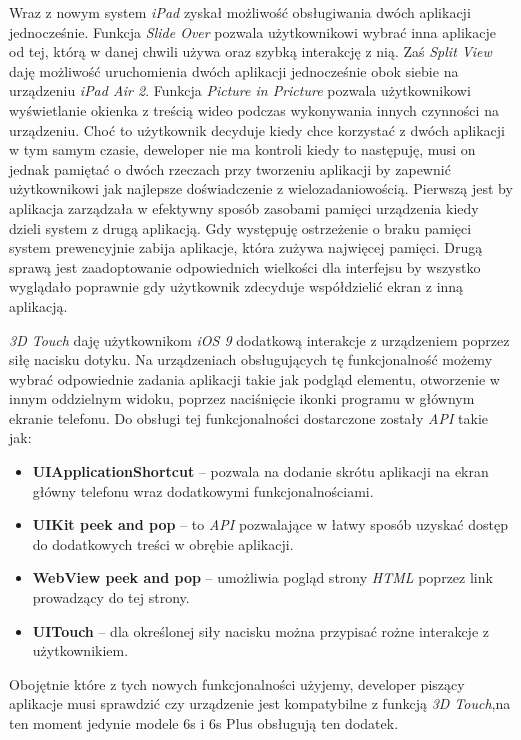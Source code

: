 \documentclass{iiuwb}
\begin{document}
Wraz z nowym system \textit{iPad} zyskał możliwość obsługiwania dwóch aplikacji jednocześnie. Funkcja \textit{Slide Over} pozwala użytkownikowi wybrać inna aplikacje od tej, którą w danej chwili używa oraz szybką interakcję z nią. Zaś \textit{Split View} daję możliwość uruchomienia dwóch aplikacji jednocześnie obok siebie na urządzeniu \textit{iPad Air 2}. Funkcja \textit{Picture in Pricture} pozwala użytkownikowi wyświetlanie okienka z treścią wideo podczas wykonywania innych czynności na urządzeniu. Choć to użytkownik decyduje kiedy chce korzystać z dwóch aplikacji w tym samym czasie, deweloper nie ma kontroli kiedy to następuję, musi on jednak pamiętać o dwóch rzeczach przy tworzeniu aplikacji by zapewnić użytkownikowi jak najlepsze doświadczenie z wielozadaniowością. Pierwszą jest by aplikacja zarządzała w efektywny sposób zasobami pamięci urządzenia kiedy dzieli system z drugą aplikacją. Gdy występuję ostrzeżenie o braku pamięci system prewencyjnie zabija aplikacje, która zużywa najwięcej pamięci. Drugą sprawą jest zaadoptowanie odpowiednich wielkości dla interfejsu by wszystko wyglądało poprawnie gdy użytkownik zdecyduje współdzielić ekran z inną aplikacją.  

\textit{3D Touch} daję użytkownikom \textit{iOS 9} dodatkową interakcje z urządzeniem poprzez siłę nacisku dotyku. Na urządzeniach obsługujących tę funkcjonalność możemy wybrać odpowiednie zadania aplikacji takie jak podgląd elementu, otworzenie w innym oddzielnym widoku,  poprzez naciśnięcie ikonki programu w głównym ekranie telefonu. Do obsługi tej funkcjonalności dostarczone zostały \textit{API} takie jak:
\begin{itemize}
\item \textbf{UIApplicationShortcut} -- pozwala na dodanie skrótu aplikacji na ekran główny telefonu wraz dodatkowymi funkcjonalnościami.
\item \textbf{UIKit peek and pop} -- to \textit{API} pozwalające w łatwy sposób uzyskać dostęp do dodatkowych treści w obrębie aplikacji.
\item \textbf{WebView peek and pop} -- umożliwia pogląd strony \textit{HTML} poprzez link prowadzący do tej strony.
\item \textbf{UITouch} -- dla określonej siły nacisku można przypisać rożne interakcje z użytkownikiem.
\end{itemize}
Obojętnie które z tych nowych funkcjonalności użyjemy, developer piszący aplikacje  musi sprawdzić czy urządzenie jest kompatybilne z funkcją \textit{3D Touch},na ten moment jedynie modele 6s i 6s Plus obsługują ten dodatek.
\end{document}
